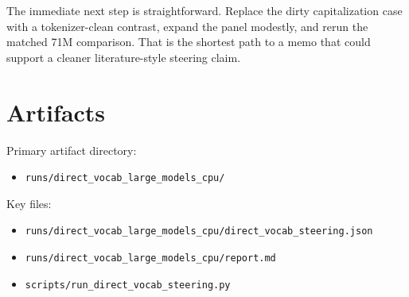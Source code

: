 \documentclass[11pt]{article}
\begin{document}
The immediate next step is straightforward. Replace the dirty capitalization
case with a tokenizer-clean contrast, expand the panel modestly, and rerun the
matched 71M comparison. That is the shortest path to a memo that could support a
cleaner literature-style steering claim.

\section{Artifacts}

Primary artifact directory:
\begin{itemize}[leftmargin=1.5em]
\item \texttt{runs/direct\_vocab\_large\_models\_cpu/}
\end{itemize}

Key files:
\begin{itemize}[leftmargin=1.5em]
\item \texttt{runs/direct\_vocab\_large\_models\_cpu/direct\_vocab\_steering.json}
\item \texttt{runs/direct\_vocab\_large\_models\_cpu/report.md}
\item \texttt{scripts/run\_direct\_vocab\_steering.py}
\end{itemize}
\end{document}
